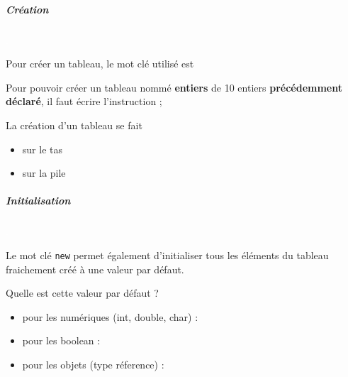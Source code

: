 \documentclass[11pt,a4paper]{article}
\begin{document}
			
		\subparagraph{Cr\'eation} 
		
                \textcolor{white}{.} \par
            
								Pour cr\'eer un tableau, le mot cl\'e utilis\'e est  \textcolor{gray}{\underline{\hspace*{2em}}} 
            \par
        
								Pour pouvoir cr\'eer un tableau nomm\'e \textbf{entiers} 
								de 10 entiers \textbf{pr\'ec\'edemment d\'eclar\'e}, il faut \'ecrire l'instruction
								 \textcolor{gray}{\underline{\hspace*{5em}}}  \textcolor{gray}{\underline{\hspace*{1em}}}  \textcolor{gray}{\underline{\hspace*{2em}}}  \textcolor{gray}{\underline{\hspace*{2em}}}  \textcolor{gray}{\underline{\hspace*{3em}}} ;
							
            \par
        La cr\'eation d'un tableau se fait
            \begin{itemize} 
        
            \item[ \ding{"6D} ] sur le tas
        
            \item[ \ding{"6D} ] sur la pile
        
            \end{itemize} 
        
			
		\subparagraph{Initialisation} 
		
                \textcolor{white}{.} \par
            
								Le mot cl\'e \verb|new| permet \'egalement d'initialiser
								tous les \'el\'ements du tableau fraichement cr\'e\'e \`a une valeur par d\'efaut. 
							
            \par
        Quelle est cette valeur par d\'efaut ?
            \par
        
					\begin{itemize}
				
			\item pour les num\'eriques (int, double, char) :  \textcolor{gray}{\underline{\hspace*{1em}}} 
			\item pour les boolean :  \textcolor{gray}{\underline{\hspace*{3em}}} 
			\item pour les objets (type r\'eference) :  \textcolor{gray}{\underline{\hspace*{3em}}} 
					\end{itemize}
				
\end{document}
